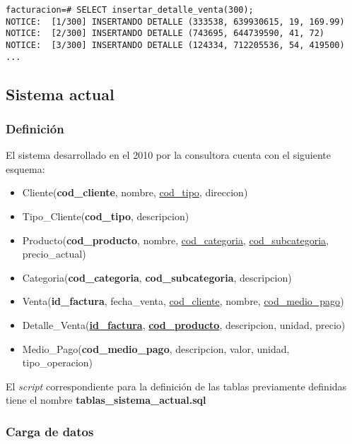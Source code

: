 \vspace*{5mm}
\begin{lstlisting}[title=Inserción de 300 detalles de ventas aleatorias en la BD]
facturacion=# SELECT insertar_detalle_venta(300);
NOTICE:  [1/300] INSERTANDO DETALLE (333538, 639930615, 19, 169.99)
NOTICE:  [2/300] INSERTANDO DETALLE (743695, 644739590, 41, 72)
NOTICE:  [3/300] INSERTANDO DETALLE (124334, 712205536, 54, 419500)
...
\end{lstlisting}

\subsection{Sistema actual}

\subsubsection{Definición}

El sistema desarrollado en el 2010 por la consultora cuenta con el siguiente esquema:

\begin{itemize}
    \item Cliente(\textbf{cod\_cliente}, nombre, \underline{cod\_tipo}, direccion)
    \item Tipo\_Cliente(\textbf{cod\_tipo}, descripcion)
    \item Producto(\textbf{cod\_producto}, nombre, \underline{cod\_categoria}, \underline{cod\_subcategoria}, precio\_actual)
    \item Categoria(\textbf{cod\_categoria}, \textbf{cod\_subcategoria}, descripcion)
    \item Venta(\textbf{id\_factura}, fecha\_venta, \underline{cod\_cliente}, nombre, \underline{cod\_medio\_pago})
    \item Detalle\_Venta(\underline{\textbf{id\_factura}}, \underline{\textbf{cod\_producto}}, descripcion, unidad, precio)
    \item Medio\_Pago(\textbf{cod\_medio\_pago}, descripcion, valor, unidad, tipo\_operacion)
\end{itemize}

El \emph{script} correspondiente para la definición de las tablas previamente definidas tiene el nombre \textbf{tablas\_sistema\_actual.sql} 

\subsubsection{Carga de datos}


